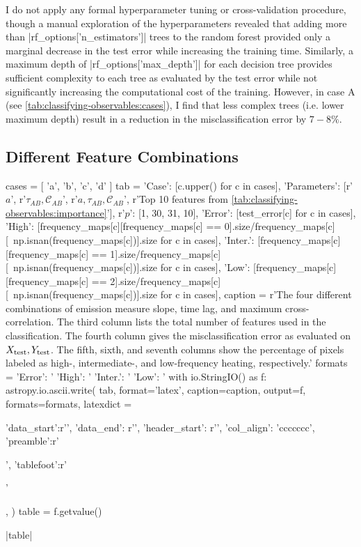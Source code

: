 I do not apply any formal hyperparameter tuning or cross-validation procedure, though a manual exploration of the hyperparameters revealed that adding more than |rf_options['n_estimators']| trees to the random forest provided only a marginal decrease in the test error while increasing the training time. Similarly, a maximum depth of |rf_options['max_depth']| for each decision tree provides sufficient complexity to each tree as evaluated by the test error while not significantly increasing the computational cost of the training. However, in case A (see \autoref{tab:classifying-observables:cases}), I find that less complex trees (i.e. lower maximum depth) result in a reduction in the misclassification error by $7-8\%$.

\subsection{Different Feature Combinations}\label{sec:classifying-observables:feature-combos}

\begin{pycode}
cases = [ 'a', 'b', 'c', 'd' ]
tab = {
    'Case': [c.upper() for c in cases],
    'Parameters': [r'$a$', r'$\tau_{AB},\mathcal{C}_{AB}$', r'$a,\tau_{AB},\mathcal{C}_{AB}$', r'Top 10 features from \autoref{tab:classifying-observables:importance}'],
    r'$p$': [1, 30, 31, 10],
    'Error': [test_error[c] for c in cases],
    'High': [frequency_maps[c][frequency_maps[c] == 0].size/frequency_maps[c][~np.isnan(frequency_maps[c])].size for c in cases],
    'Inter.': [frequency_maps[c][frequency_maps[c] == 1].size/frequency_maps[c][~np.isnan(frequency_maps[c])].size for c in cases],
    'Low': [frequency_maps[c][frequency_maps[c] == 2].size/frequency_maps[c][~np.isnan(frequency_maps[c])].size for c in cases],
}
caption = r'The four different combinations of emission measure slope, time lag, and maximum cross-correlation. The third column lists the total number of features used in the classification. The fourth column gives the misclassification error as evaluated on $X_\textup{test},Y_\textup{test}$. The fifth, sixth, and seventh columns show the percentage of pixels labeled as high-, intermediate-, and low-frequency heating, respectively.\label{tab:classifying-observables:cases}'
formats = {
    'Error': '%
    'High': '%
    'Inter.': '%
    'Low': '%
}
with io.StringIO() as f:
    astropy.io.ascii.write(
        tab,
        format='latex',
        caption=caption,
        output=f,
        formats=formats,
        latexdict = { 'data_start':r'\midrule', 'data_end': r'\bottomrule',
                      'header_start': r'\toprule', 'col_align': 'ccccccc',
                      'preamble':r'\begin{center}', 'tablefoot':r'\end{center}'},
    )
    table = f.getvalue()
\end{pycode}
|table|

